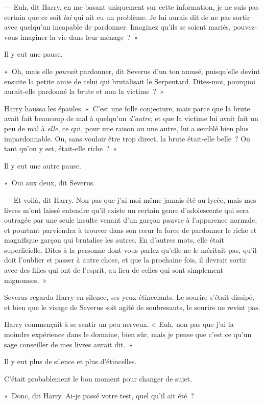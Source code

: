 --- Euh, dit Harry, en me basant uniquement sur cette information, je ne suis pas certain que ce soit \emph{lui} qui ait eu un problème.
Je lui aurais dit de ne pas sortir avec quelqu'un incapable de pardonner.
Imaginez qu'ils se soient mariés, pouvez-vous imaginer la vie dans leur ménage~?~»

Il y eut une pause.

«~Oh, mais elle \emph{pouvait} pardonner, dit Severus d'un ton amusé, puisqu'elle devint ensuite la petite amie de celui qui brutalisait le Serpentard.
Dites-moi, pourquoi aurait-elle pardonné la brute et non la victime~?~»

Harry haussa les épaules.
«~C'est une folle conjecture, mais parce que la brute avait fait beaucoup de mal à quelqu'un \emph{d'autre}, et que la victime lui avait fait un peu de mal à \emph{elle}, ce qui, pour une raison ou une autre, lui a semblé bien plus impardonnable.
Ou, sans vouloir être trop direct, la brute était-elle belle~?
Ou tant qu'on y est, était-elle riche~?~»

Il y eut une autre pause.

«~Oui aux deux, dit Severus.

--- Et voilà, dit Harry.
Non pas que j'ai moi-même jamais été au lycée, mais mes livres m'ont laissé entendre qu'il existe un certain genre d'adolescente qui sera outragée par une seule insulte venant d'un garçon pauvre à l'apparence normale, et pourtant parviendra à trouver dans son cœur la force de pardonner le riche et magnifique garçon qui brutalise les autres.
En d'autres mots, elle était superficielle.
Dites à la personne dont vous parlez qu'elle ne le méritait pas, qu'il doit l'oublier et passer à autre chose, et que la prochaine fois, il devrait sortir avec des filles qui ont de l'esprit, au lieu de celles qui sont simplement mignonnes.~»

Severus regarda Harry en silence, ses yeux étincelants.
Le sourire s'était dissipé, et bien que le visage de Severus soit agité de soubresauts, le sourire ne revint pas.

Harry commençait à se sentir un peu nerveux.
«~Euh, non pas que j'ai la moindre expérience dans le domaine, bien sûr, mais je pense que c'est ce qu'un sage conseiller de mes livres aurait dit.~»

Il y eut plus de silence et plus d'étincelles.

C'était probablement le bon moment pour changer de sujet.

«~Donc, dit Harry.
Ai-je passé votre test, quel qu'il ait été~?

